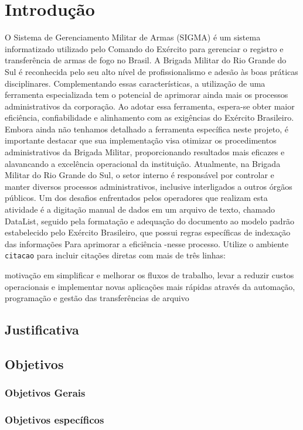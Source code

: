 \chapter{Introdução}
O Sistema de Gerenciamento Militar de Armas (SIGMA) é um sistema informatizado utilizado
pelo Comando do Exército para gerenciar o registro e transferência de armas de fogo no
Brasil. 
A Brigada Militar do Rio Grande do Sul é reconhecida pelo seu alto nível de profissionalismo e 
adesão às boas práticas disciplinares.
Complementando essas características, a utilização de uma ferramenta especializada tem o potencial de 
aprimorar ainda mais os processos administrativos da corporação.
Ao adotar essa ferramenta, espera-se obter maior eficiência, confiabilidade e alinhamento com as 
exigências do Exército Brasileiro. Embora ainda não tenhamos detalhado a ferramenta específica neste projeto,
é importante destacar que sua implementação visa otimizar os procedimentos administrativos da Brigada Militar, 
proporcionando resultados mais eficazes e alavancando a excelência operacional da instituição.
Atualmente, na Brigada Militar do Rio Grande do Sul, o setor interno é responsável por controlar e 
manter diversos processos administrativos, inclusive interligados a outros órgãos públicos. 
Um dos desafios enfrentados pelos operadores que realizam esta atividade é a digitação manual de dados em um 
arquivo de texto, chamado DataList, seguido pela formatação e adequação do documento ao modelo padrão 
estabelecido pelo Exército Brasileiro, que possui regras específicas de indexação das informações
Para aprimorar a eficiência -nesse processo.
Utilize o ambiente \texttt{citacao} para incluir
citações diretas com mais de três linhas:
\begin{citacao}
motivação em simplificar e melhorar os fluxos de trabalho, levar a reduzir custos operacionais e implementar novas aplicações mais rápidas através da automação, programação e gestão das transferências de arquivo\cite[5.3]{AndradeJunior}
\end{citacao}


\section{Justificativa}

\section{Objetivos}

\subsection{Objetivos Gerais}

\subsection{Objetivos específicos}
